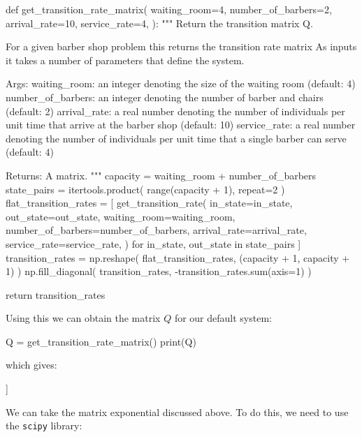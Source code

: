 \begin{pyin}
def get_transition_rate_matrix(
    waiting_room=4,
    number_of_barbers=2,
    arrival_rate=10,
    service_rate=4,
):
    """
    Return the transition matrix Q.

    For a given barber shop problem this returns the transition rate matrix
    As inputs it takes a number of
    parameters that define the system.


    Args:
        waiting_room: an integer denoting the size of the waiting room (default: 4)
        number_of_barbers: an integer denoting the number of barber and chairs (default: 2)
        arrival_rate: a real number denoting the number of individuals per unit time
                      that arrive at the barber shop (default: 10)
        service_rate: a real number denoting the number of individuals per unit time
                      that a single barber can serve (default: 4)

    Returns:
        A matrix.
    """
    capacity = waiting_room + number_of_barbers
    state_pairs = itertools.product(
        range(capacity + 1), repeat=2
    )
    flat_transition_rates = [
        get_transition_rate(
            in_state=in_state,
            out_state=out_state,
            waiting_room=waiting_room,
            number_of_barbers=number_of_barbers,
            arrival_rate=arrival_rate,
            service_rate=service_rate,
        )
        for in_state, out_state in state_pairs
    ]
    transition_rates = np.reshape(
        flat_transition_rates, (capacity + 1, capacity + 1)
    )
    np.fill_diagonal(
        transition_rates, -transition_rates.sum(axis=1)
    )

    return transition_rates
\end{pyin}

Using this we can obtain the matrix \(Q\) for our default system:

\begin{pyin}
Q = get_transition_rate_matrix()
print(Q)
\end{pyin}

which gives:

\begin{pyout}
[[-10  10   0   0   0   0   0]
 [  4 -14  10   0   0   0   0]
 [  0   8 -18  10   0   0   0]
 [  0   0   8 -18  10   0   0]
 [  0   0   0   8 -18  10   0]
 [  0   0   0   0   8 -18  10]
 [  0   0   0   0   0   8  -8]]
\end{pyout}

We can take the matrix exponential
discussed above. To do this, we need to use the \texttt{scipy}
library:

